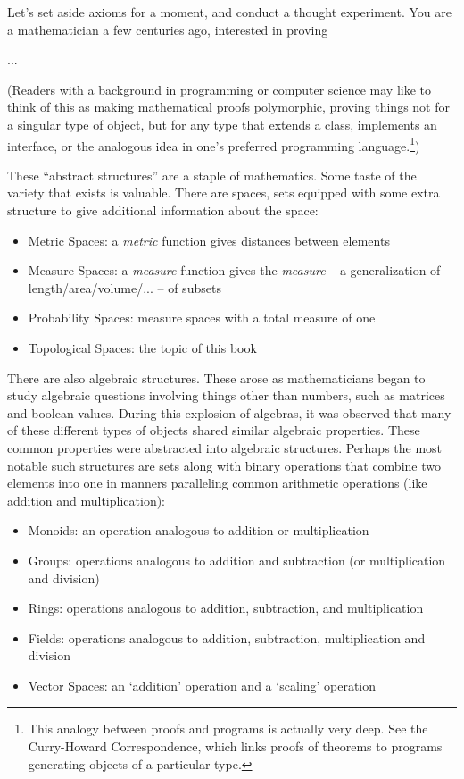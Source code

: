 \documentclass{report}
\begin{document}
Let's set aside axioms for a moment, and conduct a thought experiment. You are a mathematician a few centuries ago, interested in proving 

...

(Readers with a background in programming or computer science may like to think of this as making mathematical proofs polymorphic, proving things not for a singular type of object, but for any type that extends a class, implements an interface, or the analogous idea in one's preferred programming language.\footnote{This analogy between proofs and programs is actually very deep. See the Curry-Howard Correspondence, which links proofs of theorems to programs generating objects of a particular type.})

These ``abstract structures'' are a staple of mathematics. Some taste of the variety that exists is valuable. There are spaces, sets equipped with some extra structure to give additional information about the space:

\begin{itemize}
\item Metric Spaces: a \emph{metric} function gives distances between elements
\item Measure Spaces: a \emph{measure} function gives the \emph{measure} -- a generalization of length/area/volume/... -- of subsets
\item Probability Spaces: measure spaces with a total measure of one
\item Topological Spaces: the topic of this book
\end{itemize}

There are also algebraic structures. These arose as mathematicians began to study algebraic questions involving things other than numbers, such as matrices and boolean values. During this explosion of algebras, it was observed that many of these different types of objects shared similar algebraic properties. These common properties were abstracted into algebraic structures. Perhaps the most notable such structures are sets along with binary operations that combine two elements into one in manners paralleling common arithmetic operations (like addition and multiplication):

\begin{itemize}
\item Monoids: an operation analogous to addition or multiplication
\item Groups: operations analogous to addition and subtraction (or multiplication and division)
\item Rings: operations analogous to addition, subtraction, and multiplication
\item Fields: operations analogous to addition, subtraction, multiplication and division
\item Vector Spaces: an `addition' operation and a `scaling' operation
\end{itemize}
\end{document}
